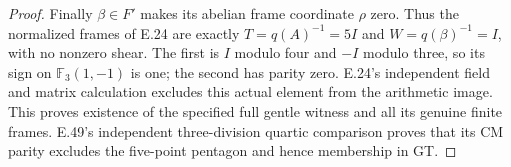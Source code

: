\begin{proof}
Finally $\beta\in F'$ makes its
abelian frame coordinate $\rho$ zero.
Thus the normalized frames of E.24
are exactly $T=q(A)^{-1}=5I$ and
$W=q(\beta)^{-1}=I$, with no nonzero
shear. The first is $I$ modulo four
and $-I$ modulo three, so its sign
on $\mathbb F_3(1,-1)$ is one;
the second has parity zero. E.24's
independent field and matrix calculation
excludes this actual element from the
arithmetic image. This proves existence
of the specified full gentle witness
and all its genuine finite frames.
E.49's independent three-division quartic
comparison proves that its CM parity
excludes the five-point pentagon and
hence membership in GT.
\end{proof}

